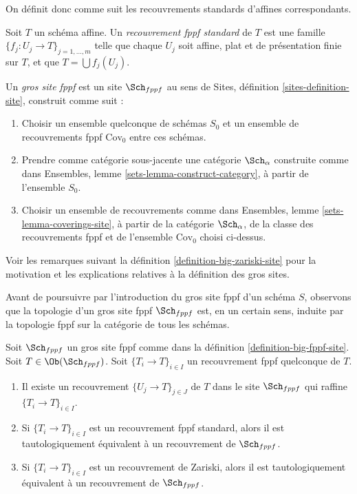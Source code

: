 \noindent
On définit donc comme suit les recouvrements standards d'affines correspondants.

\begin{definition}
\label{definition-standard-fppf}
Soit $T$ un schéma affine. Un {\it recouvrement fppf standard}
de $T$ est une famille $\{f_j : U_j \to T\}_{j = 1, \ldots, m}$
telle que chaque $U_j$ soit affine, plat et de présentation finie sur $T$,
et que $T = \bigcup f_j(U_j)$.
\end{definition}

\begin{definition}
\label{definition-big-fppf-site}
Un {\it gros site fppf} est un site $\Sch_{fppf}$ au sens de
Sites, définition \ref{sites-definition-site}, construit comme suit :
\begin{enumerate}
\item Choisir un ensemble quelconque de schémas $S_0$ et un ensemble de recouvrements fppf
$\text{Cov}_0$ entre ces schémas.
\item Prendre comme catégorie sous-jacente une catégorie $\Sch_\alpha$
construite comme dans Ensembles, lemme \ref{sets-lemma-construct-category},
à partir de l'ensemble $S_0$.
\item Choisir un ensemble de recouvrements comme dans
Ensembles, lemme \ref{sets-lemma-coverings-site}, à partir de la
catégorie $\Sch_\alpha$, de la classe des recouvrements fppf
et de l'ensemble $\text{Cov}_0$ choisi ci-dessus.
\end{enumerate}
\end{definition}

\noindent
Voir les remarques suivant la définition \ref{definition-big-zariski-site}
pour la motivation et les explications relatives à la définition des gros sites.

\medskip\noindent
Avant de poursuivre par l'introduction du gros site fppf d'un
schéma $S$, observons que la topologie d'un gros site fppf
$\Sch_{fppf}$ est, en un certain sens, induite par la topologie fppf
sur la catégorie de tous les schémas.

\begin{lemma}
\label{lemma-fppf-induced}
Soit $\Sch_{fppf}$ un gros site fppf comme dans la
définition \ref{definition-big-fppf-site}.
Soit $T \in \Ob(\Sch_{fppf})$.
Soit $\{T_i \to T\}_{i \in I}$ un recouvrement fppf quelconque de $T$.
\begin{enumerate}
\item Il existe un recouvrement $\{U_j \to T\}_{j \in J}$ de $T$ dans le site
$\Sch_{fppf}$ qui raffine $\{T_i \to T\}_{i \in I}$.
\item Si $\{T_i \to T\}_{i \in I}$ est un recouvrement fppf standard, alors
il est tautologiquement équivalent à un recouvrement de $\Sch_{fppf}$.
\item Si $\{T_i \to T\}_{i \in I}$ est un recouvrement de Zariski, alors
il est tautologiquement équivalent à un recouvrement de $\Sch_{fppf}$.
\end{enumerate}
\end{lemma}

